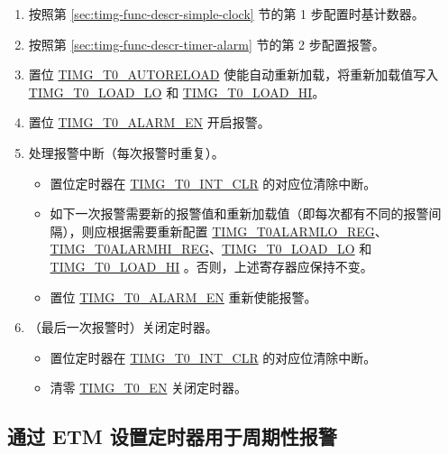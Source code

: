 \documentclass[main\_\_CN.tex]{subfiles}
\begin{document}
\begin{enumerate}
    \item 按照第 \ref{sec:timg-func-descr-simple-clock} 节的第 1 步配置时基计数器。
    \item 按照第 \ref{sec:timg-func-descr-timer-alarm} 节的第 2 步配置报警。
    \item 置位 \hyperref[fielddesc:TIMGTXAUTORELOAD]{TIMG\_T0\_AUTORELOAD} 使能自动重新加载，将重新加载值写入 \hyperref[fielddesc:TIMGTXLOADLO]{TIMG\_T0\_LOAD\_LO} 和 \hyperref[fielddesc:TIMGTXLOADHI]{TIMG\_T0\_LOAD\_HI}。
    \item 置位 \hyperref[fielddesc:TIMGTXALARMEN]{TIMG\_T0\_ALARM\_EN} 开启报警。
    \item 处理报警中断（每次报警时重复）。
    \begin{itemize}
        \item 置位定时器在 \hyperref[fielddesc:TIMGT0INTCLR]{TIMG\_T0\_INT\_CLR} 的对应位清除中断。
        \item 如下一次报警需要新的报警值和重新加载值（即每次都有不同的报警间隔），则应根据需要重新配置 \hyperref[regdesc:TIMGTXALARMLOREG]{TIMG\_T0ALARMLO\_REG}、\hyperref[regdesc:TIMGTXALARMHIREG]{TIMG\_T0ALARMHI\_REG}、\hyperref[fielddesc:TIMGTXLOADLO]{TIMG\_T0\_LOAD\_LO} 和 \hyperref[fielddesc:TIMGTXLOADHI]{TIMG\_T0\_LOAD\_HI} 。否则，上述寄存器应保持不变。
        \item 置位 \hyperref[fielddesc:TIMGTXALARMEN]{TIMG\_T0\_ALARM\_EN} 重新使能报警。
    \end{itemize}
    \item（最后一次报警时）关闭定时器。
    \begin{itemize}
        \item 置位定时器在 \hyperref[fielddesc:TIMGT0INTCLR]{TIMG\_T0\_INT\_CLR} 的对应位清除中断。
        \item 清零 \hyperref[fielddesc:TIMGTXEN]{TIMG\_T0\_EN} 关闭定时器。
    \end{itemize}
\end{enumerate}

\subsection{通过 ETM 设置定时器用于周期性报警}
\label{sec:timg-conf-etm}
\end{document}
